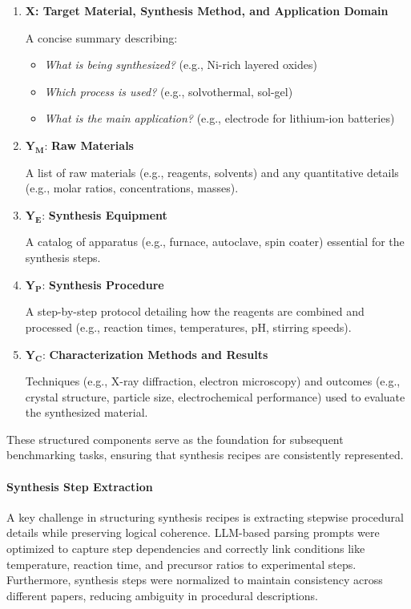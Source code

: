 \begin{enumerate}
    \item \textbf{X: Target Material, Synthesis Method, and Application Domain}
    
    A concise summary describing:
    \begin{itemize}
        \item \textit{What is being synthesized?} (e.g., Ni-rich layered oxides)
        \item \textit{Which process is used?} (e.g., solvothermal, sol-gel)
        \item \textit{What is the main application?} (e.g., electrode for lithium-ion batteries)
    \end{itemize}
    
    \item \(\mathbf{Y_M}\): \textbf{Raw Materials}
    
    A list of raw materials (e.g., reagents, solvents) and any quantitative details (e.g., molar ratios, concentrations, masses).
    
    \item \(\mathbf{Y_E}\): \textbf{Synthesis Equipment}
    
    A catalog of apparatus (e.g., furnace, autoclave, spin coater) essential for the synthesis steps.
    
    \item \(\mathbf{Y_P}\): \textbf{Synthesis Procedure}
    
    A step-by-step protocol detailing how the reagents are combined and processed (e.g., reaction times, temperatures, pH, stirring speeds).
    
    \item \(\mathbf{Y_C}\): \textbf{Characterization Methods and Results}
    
    Techniques (e.g., X-ray diffraction, electron microscopy) and outcomes (e.g., crystal structure, particle size, electrochemical performance) used to evaluate the synthesized material.
\end{enumerate}

These structured components serve as the foundation for subsequent benchmarking tasks, ensuring that synthesis recipes are consistently represented.

\paragraph{Synthesis Step Extraction}  
A key challenge in structuring synthesis recipes is extracting stepwise procedural details while preserving logical coherence. LLM-based parsing prompts were optimized to capture step dependencies and correctly link conditions like temperature, reaction time, and precursor ratios to experimental steps. Furthermore, synthesis steps were normalized to maintain consistency across different papers, reducing ambiguity in procedural descriptions.\\

